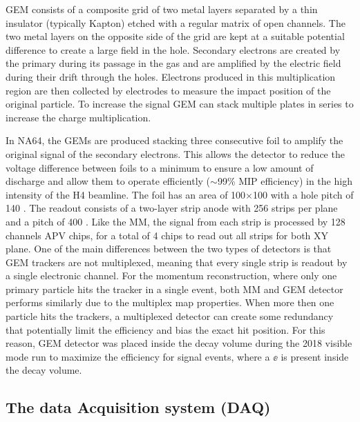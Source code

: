 GEM consists of a composite grid of two metal layers separated by a thin insulator (typically Kapton) etched with a regular matrix of open channels. The two metal layers on the opposite side of the grid are kept at a suitable potential difference to create a large field in the hole. Secondary electrons are created by the primary during its passage in the gas and are amplified by the electric field during their drift through the holes. Electrons produced in this multiplication region are then collected by electrodes to measure the impact position of the original particle. To increase the signal GEM can stack multiple plates in series to increase the charge multiplication.

In NA64, the GEMs are produced stacking three consecutive foil to amplify the original signal of the secondary electrons. This allows the detector to reduce the voltage difference between foils to a minimum to ensure a low amount of discharge and allow them to operate efficiently ($\sim$99\% MIP efficiency) in the high intensity of the H4 beamline. The foil has an area of 100$\times$100 \mms with a hole pitch of 140 \mum. The readout consists of a two-layer strip anode with 256 strips per plane and a pitch of 400 \mum. Like the MM, the signal from each strip is processed by 128 channels APV chips, for a total of 4 chips to read out all strips for both XY plane.
One of the main differences between the two types of detectors is that GEM trackers are not multiplexed, meaning that every single strip is readout by a single electronic channel. For the momentum reconstruction, where only one primary particle hits the tracker in a single event, both MM and GEM detector performs similarly due to the multiplex map properties. When more then one particle hits the trackers, a multiplexed detector can create some redundancy that potentially limit the efficiency and bias the exact hit position. For this reason, GEM detector was placed inside the decay volume during the 2018 visible mode run to maximize the efficiency for signal events, where a $\ee$ is present inside the decay volume.

\subsection{The data Acquisition system (DAQ)}
\label{ch2:sec:daq}

